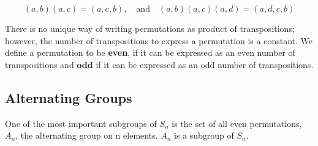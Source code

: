 \[
(a,b)(a,c) = (a,c,b), \quad \mbox{and} \quad (a,b)(a,c)(a,d) = (a,d,c,b)
\]

There is no unique way of writing permutations as product of
transpositions; however, the number of transpositions to express a
permutation is a constant. We define a permutation to be \textbf{even},
if it can be expressed as an even number of transpositions and
\textbf{odd} if it can be expressed as an odd number of transpositions.

\subsection{Alternating Groups}\label{alternating-groups}

One of the most important subgroups of \(S_n\) is the set of all even
permutations, \(A_n\), the alternating group on n elements. \(A_n\) is a
subgroup of \(S_n\).

